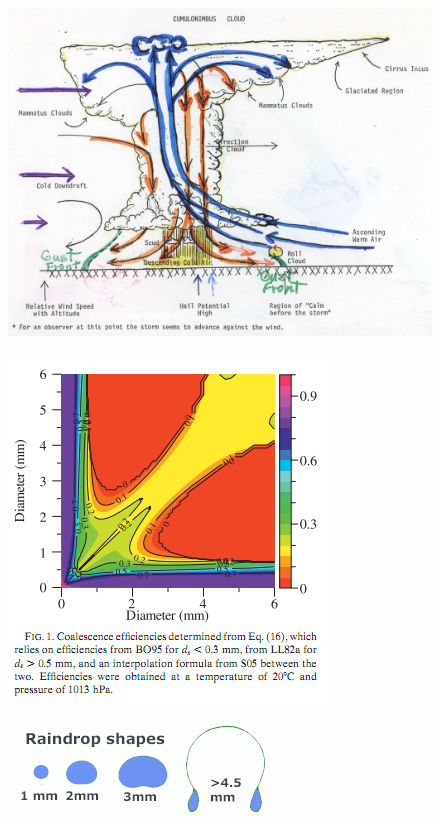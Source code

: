 \documentclass[twocolumn,a4paper,10pt]{article}
\begin{document}
\begin{figure}[t]
    \centering
    \includegraphics[width=\linewidth]{cloud}
    \caption{}
    \label{fig:cloud}
\end{figure}
\begin{figure}[t]
    \centering
    \includegraphics[width=0.75\linewidth]{coalesce_efficiency}
    \caption{}
    \label{fig:coalesce}
\end{figure}
\begin{figure}[h]
    \centering
    \includegraphics[width=0.75\linewidth]{raindrop_shapes}
    \caption{}
    \label{fig:raindrop}
\end{figure}
\end{document}
